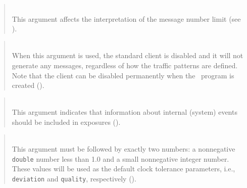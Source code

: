 \begin{quote}
\noindent{}\\ \hspace{0in}
This argument affects the interpretation of the message number limit
(see ).
\end{quote}

\begin{quote}
\noindent{}\\ \hspace{0in}
When this argument is used, the standard client is disabled and it will
not generate any messages, regardless of how the traffic patterns are defined.
Note that the client can be disabled permanently when the \smurph\ program is
created ().
\end{quote}

\begin{quote}
\noindent{}\\ \hspace{0in}
This argument indicates that information about internal (system) events
should be included in exposures ().
\end{quote}

\begin{quote}
\noindent{}\\ \hspace{0in}
This argument must be followed by exactly two numbers: a nonnegative
{\tt double} number less than 1.0 and a small nonnegative integer
number.
These values will be used as the default clock tolerance parameters, i.e.,
{\tt deviation} and {\tt quality}, respectively ().
\end{quote}

